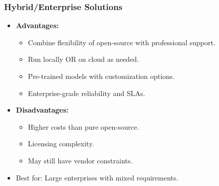\begin{frame}[fragile]\frametitle{Hybrid/Enterprise Solutions}
      \begin{itemize}
        \item \textbf{Advantages:}
        \begin{itemize}
          \item Combine flexibility of open-source with professional support.
          \item Run locally OR on cloud as needed.
          \item Pre-trained models with customization options.
          \item Enterprise-grade reliability and SLAs.
        \end{itemize}
        \item \textbf{Disadvantages:}
        \begin{itemize}
          \item Higher costs than pure open-source.
          \item Licensing complexity.
          \item May still have vendor constraints.
        \end{itemize}
        \item Best for: Large enterprises with mixed requirements.
      \end{itemize}
\end{frame}